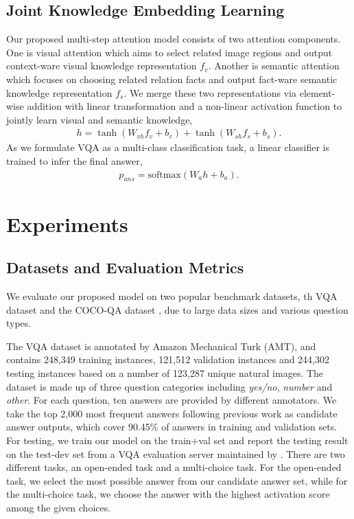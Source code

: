 \documentclass[sigconf]{acmart}
\begin{document}
\subsection{Joint Knowledge Embedding Learning} \label{subsection:53}
Our proposed multi-step attention model consists of two attention components. One is visual attention which aims to select related image regions and output context-ware visual knowledge representation $f_v$. Another is semantic attention which focuses on choosing related relation facts and output fact-ware semantic knowledge representation $f_s$. We merge these two representations via element-wise addition with linear transformation and a non-linear
activation function to jointly learn visual and semantic knowledge, 
\begin{align}
	h = \tanh(W_{vh}f_v+b_{v}) + \tanh(W_{sh}f_s+b_{s}) \label{eq:joint1}.
\end{align}
As we formulate VQA as a multi-class classification task, a linear classifier is trained to infer the final answer, 
\begin{align}
	p_{ans} = \mathrm{softmax}(W_ah+b_{a}) \label{eq:joint2}.
\end{align}





\section{Experiments}
\subsection{Datasets and Evaluation Metrics}

We evaluate our proposed model on two popular benchmark datasets, th VQA dataset \cite{antol2015vqa} and the COCO-QA dataset \cite{ren2015exploring}, due to large data sizes and various question types. 

The VQA dataset is annotated by Amazon Mechanical Turk (AMT), and  contains 248,349 training instances, 121,512 validation instances and 244,302 testing instances based on a number of 123,287 unique natural images. The dataset is made up of three question categories including \textit{yes/no}, \textit{number} and \textit{other}. For each question, ten answers are provided by different annotators. We take the top 2,000 most frequent answers following previous work \cite{kim2016hadamard} as candidate answer outputs, which cover 90.45\% of answers in training and validation sets. For testing, we train our model on the train+val set and report the testing result on the test-dev set from a VQA evaluation server maintained by \cite{antol2015vqa}. There are two different tasks, an open-ended task and a multi-choice task. For the open-ended task, we select the most possible answer from our candidate answer set, while for the multi-choice task, we choose the answer with the highest activation score among the given choices.
\end{document}

